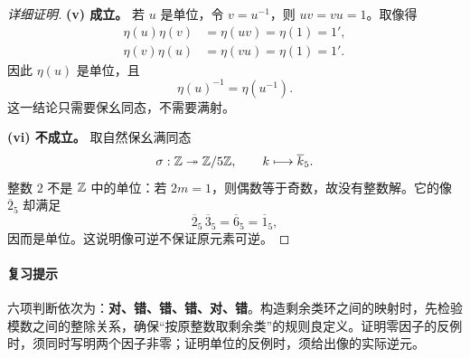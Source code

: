 \begin{proof}[详细证明]
\textbf{(v) 成立。}
若 $u$ 是单位，令 $v=u^{-1}$，则 $uv=vu=1$。取像得
\begin{align*}
\eta(u)\eta(v)&=\eta(uv)=\eta(1)=1',\\
\eta(v)\eta(u)&=\eta(vu)=\eta(1)=1'.
\end{align*}
因此 $\eta(u)$ 是单位，且
\[
\eta(u)^{-1}=\eta(u^{-1}).
\]
这一结论只需要保幺同态，不需要满射。

\textbf{(vi) 不成立。}
取自然保幺满同态
\[
\sigma:\mathbb Z\twoheadrightarrow\mathbb Z/5\mathbb Z,\qquad
k\longmapsto\overline{k}_5.
\]
整数 $2$ 不是 $\mathbb Z$ 中的单位：若 $2m=1$，则偶数等于奇数，故没有整数解。它的像 $\overline2_5$ 却满足
\[
\overline2_5\,\overline3_5=\overline6_5=\overline1_5,
\]
因而是单位。这说明像可逆不保证原元素可逆。
\end{proof}

\paragraph{复习提示}
六项判断依次为：\textbf{对、错、错、错、对、错}。构造剩余类环之间的映射时，先检验模数之间的整除关系，确保“按原整数取剩余类”的规则良定义。证明零因子的反例时，须同时写明两个因子非零；证明单位的反例时，须给出像的实际逆元。

